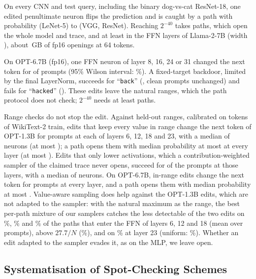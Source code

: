  On every CNN and test query, including the binary dog-vs-cat ResNet-18, one
edited penultimate neuron flips the prediction and is caught by a path with probability \CnnPathLenet{}
(LeNet-5) to \CnnPathMax{} (VGG, ResNet). Reaching $2^{-40}$ takes
\CnnPathsRange{} paths, which open the whole model and trace, and at least \PathsLlama{} in the FFN
layers of Llama-2-7B (width \WidthLlama{}), about \OpenAllLlama{}\,GB of fp16 openings at 64 tokens.

 On OPT-6.7B (fp16), one FFN neuron of layer 8, 16, 24 or 31 changed the next
token for \AttackOptLSucceeded{} of \AttackOptLPrompts{} prompts (95\% Wilson interval: \AttackOptLWilson{}\%). A fixed-target backdoor, limited by the final LayerNorm, succeeds
for ``\texttt{back}'' (\AttackOptLBackdoorBack{}, clean prompts unchanged) and fails for ``\texttt{hacked}'' (\AttackOptLBackdoorHacked{}).
These edits leave the natural ranges, which the path protocol does not check; $2^{-40}$ needs
at least \AttackOptLPaths{} paths.

 Range checks do not stop the edit. Against held-out ranges, calibrated on
\InrangeCalibTokens{} tokens of WikiText-2 train, edits that keep every value in range change the
next token of OPT-1.3B for \InrangeChanged{} prompts at each of layers 6, 12, 18 and 23, with a median of \InrangeKMedian{}
neurons (at most \InrangeKMax{}); a path opens them with median probability at most \InrangePMedianMax{} at every
layer (at most \InrangePMax{}). Edits that only lower activations, which a contribution-weighted
sampler of the claimed trace never opens, succeed for \InrangeDown{} of the \InrangePrompts{} prompts at those
layers, with a median of \InrangeDownKMedian{} neurons. On OPT-6.7B, in-range edits change the next
token for \InrangeOptLChanged{} prompts at every layer, and a path opens them with median
probability at most \InrangeOptLPMedianMax{}. Value-aware sampling does help against the OPT-1.3B
edits, which are not adapted to the sampler: with the natural maximum as the range, the best
per-path mixture of our samplers catches the less detectable of the two edits on \GameLayerSix{}\%, \GameLayerTwelve{}\% and \GameLayerEighteen{}\% of
the paths that enter the FFN of layers 6, 12 and 18 (mean over prompts), above $27.7/N$ (\GameThreshold{}\%),
and on \GameLayerTwentyThree{}\% at layer 23 (uniform: \GameUniform{}\%).
Whether an edit adapted to the sampler evades it, as on the MLP, we leave open.

\subsection{Systematisation of Spot-Checking Schemes}
\label{sec:sok}


